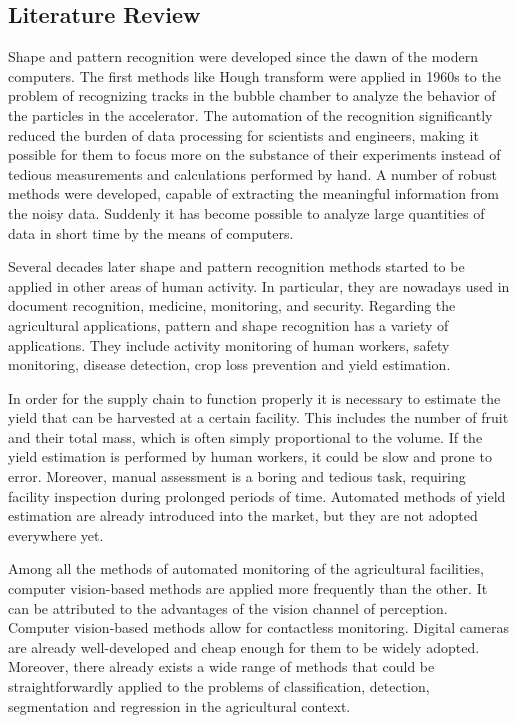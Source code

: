 \begin{thebibliography}{12}
\section{Literature Review}

Shape and pattern recognition were developed since the dawn of the modern computers.
The first methods like Hough transform \cite{hough1962method} were applied in 1960s to the problem of recognizing tracks in the bubble chamber to analyze the behavior of the particles in the accelerator.
The automation of the recognition significantly reduced the burden of data processing for scientists and engineers, making it possible for them to focus more on the substance of their experiments instead of tedious measurements and calculations performed by hand.
A number of robust methods were developed, capable of extracting the meaningful information from the noisy data.
Suddenly it has become possible to analyze large quantities of data in short time by the means of computers.

Several decades later shape and pattern recognition methods started to be applied in other areas of human activity.
In particular, they are nowadays used in document recognition, medicine, monitoring, and security.
Regarding the agricultural applications, pattern and shape recognition has a variety of applications.
They include activity monitoring of human workers, safety monitoring, disease detection, crop loss prevention and yield estimation.

In order for the supply chain to function properly it is necessary to estimate the yield that can be harvested at a certain facility.
This includes the number of fruit and their total mass, which is often simply proportional to the volume.
If the yield estimation is performed by human workers, it could be slow and prone to error.
Moreover, manual assessment is a boring and tedious task, requiring facility inspection during prolonged periods of time.
Automated methods of yield estimation are already introduced into the market, but they are not adopted everywhere yet.

Among all the methods of automated monitoring of the agricultural facilities, computer vision-based methods are applied more frequently than the other.
It can be attributed to the advantages of the vision channel of perception.
Computer vision-based methods allow for contactless monitoring.
Digital cameras are already well-developed and cheap enough for them to be widely adopted.
Moreover, there already exists a wide range of methods that could be straightforwardly applied to the problems of classification, detection, segmentation and regression in the agricultural context.


\end{thebibliography}
